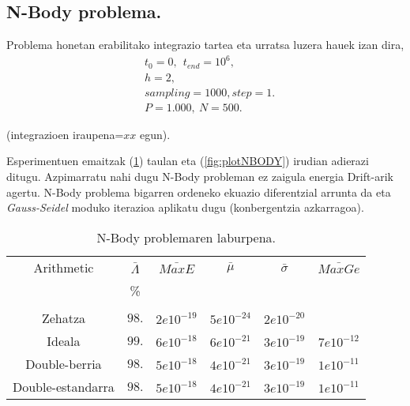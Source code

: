 \clearpage
\subsection{N-Body problema.}

Problema honetan erabilitako integrazio tartea eta urratsa luzera hauek izan dira,
\begin{align*}
& t_0=0, \ \ t_{end}=10^{6}, \\
& h=2, \\
& sampling=1000, step=1.\\
& P=1.000, \ N=500. 
\end{align*} 

(integrazioen iraupena=$xx$ egun).

Esperimentuen emaitzak (\ref{tab:tabNBODY}) taulan eta (\ref{fig:plotNBODY}) irudian adierazi ditugu. Azpimarratu nahi dugu N-Body probleman ez zaigula energia Drift-arik agertu. N-Body problema bigarren ordeneko ekuazio diferentzial arrunta da eta \emph{Gauss-Seidel} moduko iterazioa aplikatu dugu (konbergentzia azkarragoa).

\begin{table} [h]
\caption{N-Body problemaren laburpena.}
\label{tab:tabNBODY}       %
\begin{tabular}{c|c c c c c} 
 Arithmetic   &  $\bar{\Lambda}$  &  $\bar{MaxE}$ & $\bar{\mu}$  & $\bar{\sigma}$   & $\bar{MaxGe}$  \\
                           &   \%            &       &          &            &         \\
 \hline
                           &                 &         &       &           &          \\
 Zehatza                   &   $98.$        &  $2e10^{-19}$  & $5e10^{-24}$  & $2e10^{-20}$  &      \\	    
 Ideala                    &   $99.$        &  $6e10^{-18}$  & $6e10^{-21}$  & $3e10^{-19}$ &  $7e10^{-12}$\\
 Double-berria             &   $98.$       &  $5e10^{-18}$  & $4e10^{-21}$  & $3e10^{-19}$ &  $1e10^{-11}$\\
 Double-estandarra         &   $98.$       &  $5e10^{-18}$  & $4e10^{-21}$  & $3e10^{-19}$ &  $1e10^{-11}$\\
\end{tabular}
\end{table}


